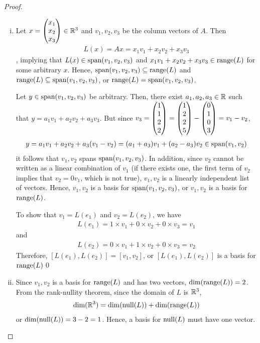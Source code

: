\begin{proof}
    \renewcommand{\qedsymbol}{$\blacksquare$}
    \begin{enumerate}[(i)]
    \item 
        Let $x=\begin{pmatrix} x_1\\ x_2\\ x_3\end{pmatrix}\in\mathbb R^3$ and $v_1,v_2,v_3$ be the column vectors of $A$. Then 
        \[
            \begin{aligned}
                L(x) = Ax = x_1v_1+x_2v_2+x_3v_3
            \end{aligned}
        \]
        , implying that $L(x)\in\textnormal{span}(v_1,v_2,v_3)$ and $x_1v_1+x_2v_2+x_3v_3\in\textnormal{range}(L)$ for some arbitrary $x$. Hence, $\textnormal{span}(v_1,v_2,v_3)\subseteq\textnormal{range}(L)$ and $\textnormal{range}(L)\subseteq\textnormal{span}(v_1,v_2,v_3)$, or $\textnormal{range}(L)=\textnormal{span}(v_1,v_2,v_3)$.
        
        Let $y\in\textnormal{span}(v_1,v_2,v_3)$ be arbitrary.
        Then, there exist $a_1,a_2,a_3\in\mathbb R$ such that $y=a_1v_1+a_2v_2+a_3v_3$.
        But since $v_3=\begin{pmatrix} 1\\ 1\\2 \\ 2\end{pmatrix}=\begin{pmatrix} 1\\ 2\\2 \\ 5\end{pmatrix}-\begin{pmatrix} 0\\ 1\\0 \\ 3\end{pmatrix}=v_1-v_2$,
        \[
            \begin{aligned}
                y=a_1v_1+a_2v_2+a_3(v_1-v_2)=(a_1+a_3)v_1+(a_2-a_3)v_2\in\textnormal{span}(v_1,v_2)
            \end{aligned}
        \]
        it follows that $v_1,v_2$ spans $\textnormal{span}(v_1,v_2,v_3)$.
        In addition, since $v_2$ cannot be written as a linear combination of $v_1$ (if there exists one, the first term of $v_2$ implies that $v_2=0v_1$, which is not true), $v_1,v_2$ is a linearly independent list of vectors.
        Hence, $v_1,v_2$ is a basis for $\textnormal{span}(v_1,v_2,v_3)$, or $v_1,v_2$ is a basis for $\textnormal{range}(L)$.

        To show that $v_1=L(e_1)$ and $v_2=L(e_2)$, we have 
        \[
            \begin{aligned}
                L(e_1)=1\times v_1+0\times v_2+0\times v_3=v_1
            \end{aligned}
        \]
        and 
        \[
            \begin{aligned}
                L(e_2)=0\times v_1+1\times v_2+0\times v_3=v_2
            \end{aligned}
        \]
        Therefore, $[L(e_1),L(e_2)]=[v_1,v_2]$, or $[L(e_1),L(e_2)]$ is a basis for $\textnormal{range}(L)$\qed
        \item 
        Since $v_1,v_2$ is a basis for $\textnormal{range}(L)$ and has two vectors, $\textnormal{dim}(\textnormal{range}(L))=2$.
        From the rank-nullity theorem, since the domain of $L$ is $\mathbb R^3$, 
        \[
            \begin{aligned}
                \textnormal{dim}(\mathbb R^3)=\textnormal{dim}(\textnormal{null}(L))+\textnormal{dim}(\textnormal{range}(L))
            \end{aligned}
        \]
        or $\textnormal{dim}(\textnormal{null}(L))=3-2=1$. Hence, a basis for $\textnormal{null}(L)$ must have one vector.


\end{enumerate}
\end{proof}
